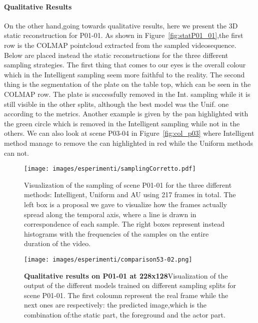 \paragraph{Qualitative Results}On the other hand,going towards qualitative results, here we present the 3D static reconstruction for P01-01.
As shown in Figure~\ref{fig:statP01_01},the first row is the COLMAP pointcloud extracted from the sampled videosequence. Below are placed
instead the static reconstructions for the three different sampling strategies. The first thing that comes to our eyes is 
the overall colour which in the Intelligent sampling seem more faithful to the reality. The second thing is the segmentation of 
the plate on the table top, which can be seen in the COLMAP row. The plate is successfully removed in the Int. sampling while
it is still visible in the other splits, although the best model was the Unif. one according to the metrics. Another example 
is given by the pan highlighted with the green circle which is removed in the Intelligent sampling while not in the others.
We can also look at scene P03-04 in Figure~\ref{fig:col_p03} where Intelligent method manage to remove the can highlighted
in red while the Uniform methods can not.
\begin{figure}[H]
    \centering
    \texttt{[image: images/esperimenti/samplingCorretto.pdf]} 
    \caption{Visualization of the sampling of scene P01-01 for the three different methods: Intelligent, Uniform and AU using 217 frames in total.
        The left box is a proposal we gave to visualize how the frames actually spread along the temporal axis, where a line is drawn in correspondence
        of each sample. The right boxes represent instead histograms with the frequencies of the samples on the entire duration of the video.}\label{fig:samplFreq}
\end{figure}




\begin{figure}[H]
    \hspace{-2cm}
    \centering
    \texttt{[image: images/esperimenti/comparison53-02.png]} 
    \caption{\textbf{Qualitative results on P01-01 at 228x128}Visualization of the output of the different models trained on different
    sampling splits for scene P01-01. The first coloumn represent the real frame while the next ones
    are respectively: the predicted image,which is the combination of:the static part, the foreground and the actor part.}\label{fig:comp}
\end{figure}


